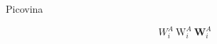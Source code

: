 \documentclass{article}
\begin{document}
Picovina

$$W^A_i \  \mathrm{W}^A_i \ \mathbf{W}^A_i$$
\end{document}
